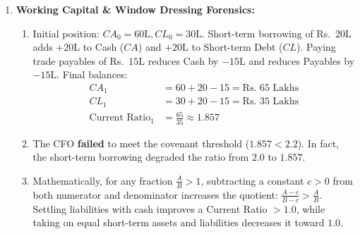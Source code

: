 \begin{enumerate}[label=\textbf{P2.\arabic*}]
    \item \textbf{Working Capital \& Window Dressing Forensics:}
    \begin{enumerate}[label=(\alph*)]
        \item Initial position: $CA_0 = 60\text{L}, CL_0 = 30\text{L}$.
        Short-term borrowing of Rs.~$20$L adds $+20\text{L}$ to Cash ($CA$) and $+20\text{L}$ to Short-term Debt ($CL$).
        Paying trade payables of Rs.~$15$L reduces Cash by $-15\text{L}$ and reduces Payables by $-15\text{L}$.
        Final balances:
        \begin{align*}
        CA_1 &= 60 + 20 - 15 = \text{Rs.~} 65\text{ Lakhs} \\
        CL_1 &= 30 + 20 - 15 = \text{Rs.~} 35\text{ Lakhs} \\
        \text{Current Ratio}_1 &= \frac{65}{35} \approx \mathbf{1.857}
        \end{align*}
        \item The CFO \textbf{failed} to meet the covenant threshold ($1.857 < 2.2$). In fact, the short-term borrowing degraded the ratio from $2.0$ to $1.857$.
        \item Mathematically, for any fraction $\frac{A}{B} > 1$, subtracting a constant $c > 0$ from both numerator and denominator increases the quotient: $\frac{A - c}{B - c} > \frac{A}{B}$. Settling liabilities with cash improves a Current Ratio $> 1.0$, while taking on equal short-term assets and liabilities decreases it toward $1.0$.
    \end{enumerate}


\end{enumerate}
